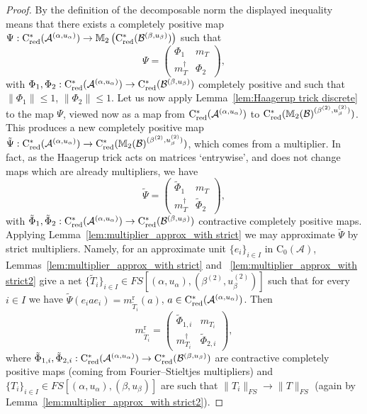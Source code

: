 \documentclass[11 pt, leqno]{amsart}
\numberwithin{equation}{section}
\theoremstyle{plain}
\theoremstyle{definition}
\newcommand{\Mat}{\mathbb M} %
\newcommand*{\contz}{\mathrm{C_0}}%
\DeclareMathOperator{\red}{red}%
\DeclareMathOperator{\rd}{r}%
\newcommand{\B}{\mathcal B}
\newcommand{\m}{m}
\newcommand{\A}{\mathcal A}
\newcommand{\cst}{\ifmmode\mathrm{C}^*\else{$\mathrm{C}^*$}\fi}
\begin{document}
\begin{proof}
By the definition of the decomposable norm the displayed inequality means that there exists a completely positive map $\Psi : \cst_{\red}(\A^{(\alpha,u_{\alpha})}) \to \Mat_2 \left(\cst_{\red}(\B^{(\beta,u_{\beta})})\right)$ such that 
\[ 
    \Psi = \begin{pmatrix} 
                \Phi_1 & \m_T \\ 
                \m_T^\dagger & \Phi_2\ 
            \end{pmatrix} ,
\]
with $\Phi_1, \Phi_2 : \cst_{\red}(\A^{(\alpha,u_{\alpha})}) \to \cst_{\red}(\B^{(\beta,u_{\beta})})$ completely positive and such that $\| \Phi_1 \| \leq 1$, $\|\Phi_2 \|\leq 1$.
Let us now apply Lemma~\ref{lem:Haagerup trick discrete} to the map $\Psi$, viewed now as a map from $\cst_{\red}(\A^{(\alpha,u_{\alpha})})$ to $\cst_{\red}(\Mat_2(\B)^{(\beta^{(2)},u_{\beta}^{(2)})})$. 
This produces a new completely positive map $\tilde{\Psi}: \cst_{\red}(\A^{(\alpha,u_{\alpha})})\to \cst_{\red}( \Mat_2(\B)^{(\beta^{(2)} , u_{\beta}^{(2)})} )$, which comes from a multiplier. 
In fact, as the Haagerup trick acts on matrices `entrywise', and does not change maps which are already multipliers, we have
\[ 
    \tilde{\Psi} = \begin{pmatrix} 
                        \tilde{\Phi}_1 & \m_T \\ 
                        \m_T^\dagger & \tilde{\Phi}_2
                    \end{pmatrix} ,
\]
with $\tilde{\Phi}_1 , \tilde{\Phi}_2 : \cst_{\red}(\A^{(\alpha,u_{\alpha})}) \to \cst_{\red}(\B^{(\beta,u_{\beta})})$ contractive completely positive maps. 
Applying Lemma~\ref{lem:multiplier_approx_with strict} we may approximate  $\tilde{\Psi}$ by strict multipliers. 
Namely, for an approximate unit $\{ e_i \}_{i\in I}$ in $\contz(\A)$, Lemmas~\ref{lem:multiplier_approx_with strict} and ~\ref{lem:multiplier_approx_with strict2} give  a net $\{\tilde{T}_i\}_{i\in I}\in FS[(\alpha,u_{\alpha}),(\beta^{(2)},u_{\beta}^{(2)})]$ such that for every $i \in I$ we have $\tilde{\Psi}(e_ia  e_i) = \m_{\tilde{T}_i}^{\rd}(a)$, $a\in \cst_{\red}(\A^{(\alpha,u_{\alpha})})$. 
Then
\[ 
    \m_{\tilde{T}_i}^{\rd} =    \begin{pmatrix} 
                                    \tilde{\Phi}_{1,i} & \m_{T_i} \\ 
                                    \m_{T_i}^\dagger & \tilde{\Phi}_{2,i}
                                \end{pmatrix},
\]
where $\tilde{\Phi}_{1,i}, \tilde{\Phi}_{2,i} : \cst_{\red}(\A^{(\alpha,u_{\alpha})}) \to \cst_{\red}(\B^{(\beta,u_{\beta})})$ are contractive completely positive maps (coming from Fourier--Stieltjes multipliers) and $\{T_i\}_{i\in I}\in FS[(\alpha,u_{\alpha}),(\beta,u_{\beta})]$ are such that $\| T_i \|_{FS} \to \|T\|_{FS}$ (again by Lemma~\ref{lem:multiplier_approx_with strict2}). 


\end{proof}
\end{document}
